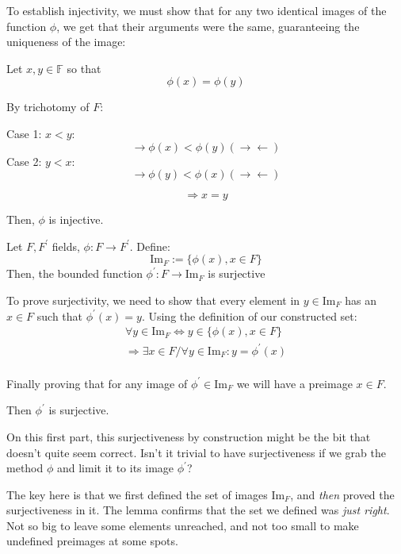 \begin{bookproof}
To establish injectivity, we must show that for any two identical images of the function $\phi$, we get that their arguments were the same, guaranteeing the uniqueness of the image:

Let $x, y \in \mathbb{F}$ so that $$\phi(x) = \phi(y)$$

By trichotomy of $F$:

Case 1: $x < y$: $$\rightarrow \phi(x) < \phi(y) (\rightarrow\leftarrow)$$
Case 2: $y < x$: $$\rightarrow \phi(y) < \phi(x) (\rightarrow\leftarrow)$$

$$\Rightarrow x = y$$

Then, $\phi$ is injective.
\end{bookproof}


\begin{lemma}\label{le:sur-by-construction}
Let $F, F^\prime$ fields, $\phi: F \rightarrow F^\prime$. Define: $$\text{Im}_F := \{\phi(x), x \in F\}$$
Then, the bounded function $\phi^\prime: F \rightarrow \text{Im}_F$ is surjective
\end{lemma}

\begin{bookproof}
To prove surjectivity, we need to show that every element in $y \in \text{Im}_F$ has an $x \in F$ such that $\phi^\prime(x) = y$. Using the definition of our constructed set:
\begin{align*}
\forall y \in \text{Im}_F \Leftrightarrow y \in \{\phi(x), x \in F\}\\
\Rightarrow \exists x \in F / \forall y \in \text{Im}_F: y = \phi^\prime(x)\\
\end{align*}

Finally proving that for any image of $\phi^\prime \in \text{Im}_F$ we will have a preimage $x \in F$.

Then $\phi^\prime$ is surjective.
\end{bookproof}

On this first part, this surjectiveness by construction might be the bit that doesn't quite seem correct. Isn't it trivial to have surjectiveness if we grab the method $\phi$ and limit it to its image $\phi^\prime$?

The key here is that we first defined the set of images $\text{Im}_F$, and \textit{then} proved the surjectiveness in it. The lemma confirms that the set we defined was \textit{just right}. Not so big to leave some elements unreached, and not too small to make undefined preimages at some spots.


